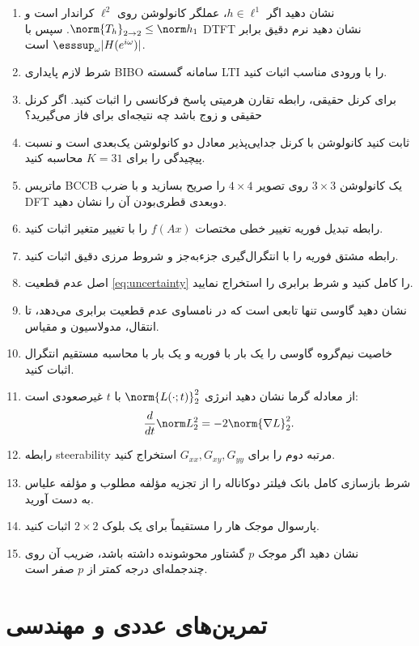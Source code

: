 \begin{enumerate}
\item نشان دهید اگر \(h\in\ell^1\)، عملگر کانولوشن روی \(\ell^2\) کراندار است و
\(\norm{T_h}_{2\to2}\le\norm h_1\). سپس با DTFT نشان دهید نرم دقیق برابر
\(\esssup_\omega|H(e^{i\omega})|\) است.
\item شرط لازم پایداری BIBO سامانه گسسته LTI را با ورودی مناسب اثبات کنید.
\item برای کرنل حقیقی، رابطه تقارن هرمیتی پاسخ فرکانسی را اثبات کنید. اگر کرنل حقیقی و زوج باشد چه نتیجه‌ای
برای فاز می‌گیرید؟
\item ثابت کنید کانولوشن با کرنل جدایی‌پذیر معادل دو کانولوشن یک‌بعدی است و نسبت پیچیدگی را برای
\(K=31\) محاسبه کنید.
\item ماتریس BCCB یک کانولوشن \(3\times3\) روی تصویر \(4\times4\) را صریح بسازید و با ضرب DFT
دوبعدی قطری‌بودن آن را نشان دهید.
\item رابطه تبدیل فوریه تغییر خطی مختصات \(f(Ax)\) را با تغییر متغیر اثبات کنید.
\item رابطه مشتق فوریه را با انتگرال‌گیری جزءبه‌جز و شروط مرزی دقیق اثبات کنید.
\item اصل عدم قطعیت \eqref{eq:uncertainty} را کامل کنید و شرط برابری را استخراج نمایید.
\item نشان دهید گاوسی تنها تابعی است که در نامساوی عدم قطعیت برابری می‌دهد، تا انتقال، مدولاسیون و مقیاس.
\item خاصیت نیم‌گروه گاوسی را یک بار با فوریه و یک بار با محاسبه مستقیم انتگرال اثبات کنید.
\item از معادله گرما نشان دهید انرژی \(\norm{L(\cdot;t)}_2^2\) با \(t\) غیرصعودی است:
\begin{equation}
\frac{d}{dt}\norm L_2^2=-2\norm{\nabla L}_2^2.
\end{equation}
\item رابطه steerability مرتبه دوم را برای \(G_{xx},G_{xy},G_{yy}\) استخراج کنید.
\item شرط بازسازی کامل بانک فیلتر دوکاناله را از تجزیه مؤلفه مطلوب و مؤلفه علیاس به دست آورید.
\item پارسوال موجک هار را مستقیماً برای یک بلوک \(2\times2\) اثبات کنید.
\item نشان دهید اگر موجک \(p\) گشتاور محوشونده داشته باشد، ضریب آن روی چندجمله‌ای درجه کمتر از \(p\)
صفر است.
\end{enumerate}

\section{تمرین‌های عددی و مهندسی}


